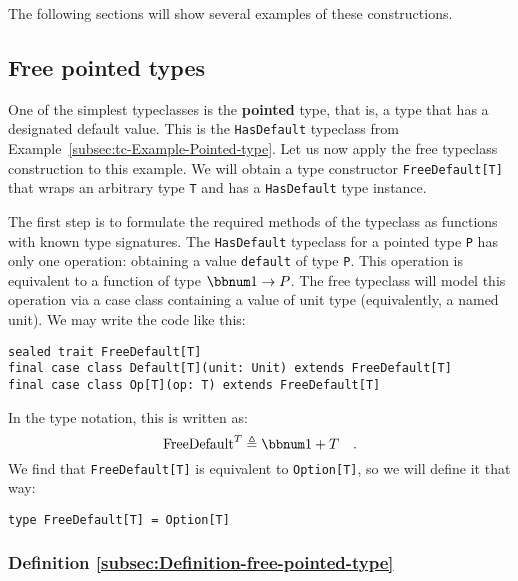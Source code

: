 The following sections will show several examples of these constructions.

\subsection{Free pointed types}

One of the simplest typeclasses is the \textbf{pointed}
type, that is, a type that has a designated default value. This is
the \lstinline!HasDefault!
typeclass from Example~\ref{subsec:tc-Example-Pointed-type}. Let
us now apply the free typeclass construction to this example. We will
obtain a type constructor \lstinline!FreeDefault[T]!
that wraps an arbitrary type \lstinline!T!
and has a \lstinline!HasDefault!
type instance.

The first step is to formulate the required methods of the typeclass
as functions with known type signatures. The \lstinline!HasDefault!
typeclass for a pointed type \lstinline!P!
has only one operation: obtaining a value \lstinline!default!
of type \lstinline!P!.
This operation is equivalent to a function of type $\bbnum 1\rightarrow P$.
The free typeclass will model this operation via a case class containing
a value of unit type (equivalently, a named unit). We may write the
code like this:
\begin{lstlisting}
sealed trait FreeDefault[T]
final case class Default[T](unit: Unit) extends FreeDefault[T]
final case class Op[T](op: T) extends FreeDefault[T]
\end{lstlisting}
In the type notation, this is written as:
\[
\text{FreeDefault}^{T}\triangleq\bbnum 1+T\quad.
\]
 We find that \lstinline!FreeDefault[T]!
is equivalent to \lstinline!Option[T]!,
so we will define it that way:
\begin{lstlisting}
type FreeDefault[T] = Option[T]
\end{lstlisting}

\subsubsection{Definition \label{subsec:Definition-free-pointed-type}\ref{subsec:Definition-free-pointed-type}}

